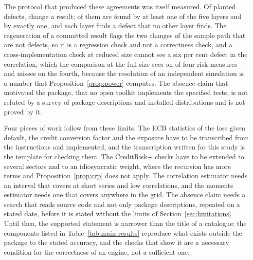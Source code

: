 The protocol that produced these agreements was itself measured.
Of \ablMutants{} planted defects, \ablReal{} change a result; \ablAny{} of them are found by at least one of the five layers and \ablOnly{} by exactly one, and each layer finds a defect that no other layer finds.
The regeneration of a committed result flags the two changes of the sample path that are not defects, so it is a regression check and not a correctness check, and a cross-implementation check at reduced size cannot see a six per cent defect in the correlation, which the comparison at the full size sees on \fsFlagged{} of four risk measures and misses on the fourth, because the resolution of an independent simulation is a number that Proposition~\ref{prop:power} computes.
The absence claim that motivated the package, that no open toolkit implements the specified tests, is not refuted by a survey of \pypiFound{} package descriptions and \distScanned{} installed distributions and is not proved by it.

Four pieces of work follow from these limits.
The ECB statistics of the loss given default, the credit conversion factor and the exposure have to be transcribed from the instructions and implemented, and the transcription written for this study is the template for checking them.
The CreditRisk+ checks have to be extended to several sectors and to an idiosyncratic weight, where the recursion has more terms and Proposition~\ref{prop:crp} does not apply.
The correlation estimator needs an interval that covers at short series and low correlations, and the moments estimator needs one that covers anywhere in the grid.
The absence claim needs a search that reads source code and not only package descriptions, repeated on a stated date, before it is stated without the limits of Section~\ref{sec:limitations}.
Until then, the supported statement is narrower than the title of a catalogue: the components listed in Table~\ref{tab:main-results} reproduce what exists outside the package to the stated accuracy, and the checks that show it are a necessary condition for the correctness of an engine, not a sufficient one.
